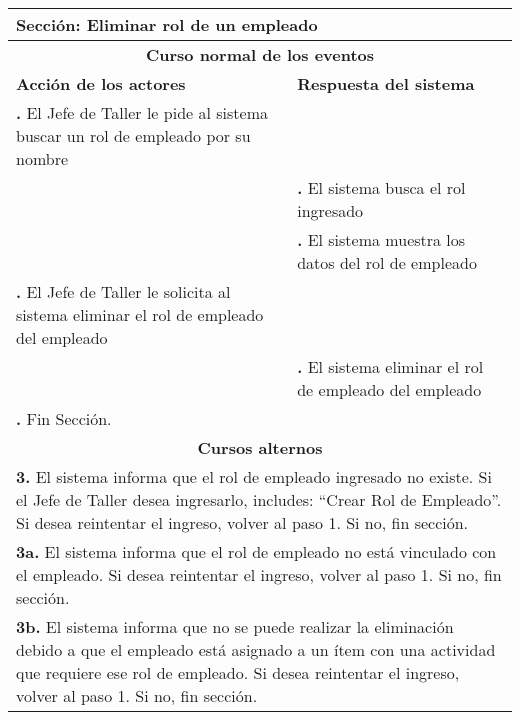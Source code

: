 \documentclass[12pt]{extarticle}
\newcounter{step}
\newcommand\inc{\stepcounter{step}\textbf{\thestep. }}
\newcommand\resetinc{\setcounter{step}{0}}
\begin{document}
	\begin{longtable}{ |p{8cm}|p{8cm}| }
		\hline
		\multicolumn{2}{|p{16cm}|}{\textbf{Sección}: Eliminar rol de un empleado}\\
		\hline
		\multicolumn{2}{|c|}{\textbf{Curso normal de los eventos}}\\
		\hline
		\textbf{Acción de los actores} & \textbf{Respuesta del sistema}\\
		\hline
			\inc El Jefe de Taller le pide al sistema buscar un rol de empleado por su nombre& \\
			\hline
		    & \inc El sistema busca el rol ingresado \\
			\hline
		    & \inc El sistema muestra los datos del rol de empleado \\
			\hline
			\inc El Jefe de Taller le solicita al sistema eliminar el rol de empleado del empleado &\\
			\hline
		    & \inc El sistema eliminar el rol de empleado del empleado\\
			\hline
            \inc Fin Sección. & \\
		\hline
		\multicolumn{2}{|c|}{\textbf{Cursos alternos}}\\
		\hline
        \multicolumn{2}{|p{16cm}|}{\textbf{3. }El sistema informa que el rol de empleado ingresado no existe. Si el Jefe de Taller desea ingresarlo, includes: ``Crear Rol de Empleado''. Si desea reintentar el ingreso, volver al paso 1. Si no, fin sección.}\\
		\hline
        \multicolumn{2}{|p{16cm}|}{\textbf{3a. }El sistema informa que el rol de empleado no está vinculado con el empleado. Si desea reintentar el ingreso, volver al paso 1. Si no, fin sección.}\\
		\hline
        \multicolumn{2}{|p{16cm}|}{\textbf{3b. }El sistema informa que no se puede realizar la eliminación debido a que el empleado está asignado a un ítem con una actividad que requiere ese rol de empleado. Si desea reintentar el ingreso, volver al paso 1. Si no, fin sección.}\\
		\hline
	\end{longtable}

    \resetinc
\end{document}
